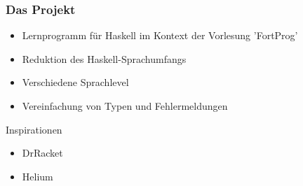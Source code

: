 \begin{frame}
	\frametitle{Das Projekt}
	\begin{itemize}
		\item Lernprogramm für Haskell im Kontext der Vorlesung 'FortProg' \pause
		\item Reduktion des Haskell-Sprachumfangs
		\item Verschiedene Sprachlevel
		\item Vereinfachung von Typen und Fehlermeldungen
	\end{itemize}
	Inspirationen \pause
	\begin{itemize}
		\item DrRacket
		\item Helium
	\end{itemize}
\end{frame}